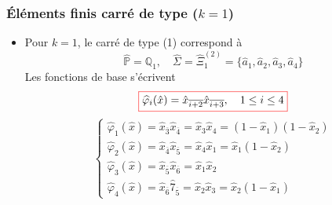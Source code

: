 \documentclass{beamer}
\newcommand{\myredbox}[1]{\fcolorbox{red}{white}{$\displaystyle#1$}}
\begin{document}
\begin{frame}
\frametitle{Éléments finis carré de type ($k=1$)}
 \begin{center}
   \end{center}
  \begin{itemize}
\item  Pour $k = 1$, le carré de type (1) correspond à
\[\widehat{\mathbb{P}} = \mathbb{Q}_1,\quad \widehat{\Sigma} =\widehat{\Xi}_1^{(2)}=\{\hat{a}_1,\hat{a}_2,\hat{a}_3,\hat{a}_4\}\]
Les fonctions de base s'écrivent
\[\myredbox{\widehat{\varphi}_i(\hat{x})=\hat{x}_{\overline{i+2}}\hat{x}_{\overline{i+3}},\quad 1\leq i\leq 4}\]
\[\left\{\begin{array}{l}
\widehat{\varphi}_1(\hat{x})=\hat{x}_{\overline{3}}\hat{x}_{\overline{4}}=\hat{x}_{3}\hat{x}_{4}=(1-\hat{x}_1)(1-\hat{x}_2)\\
\widehat{\varphi}_2(\hat{x})=\hat{x}_{\overline{4}}\hat{x}_{\overline{5}}=\hat{x}_{4}\hat{x}_{1}=\hat{x}_1(1-\hat{x}_2)\\
\widehat{\varphi}_3(\hat{x})=\hat{x}_{\overline{5}}\hat{x}_{\overline{6}}=\hat{x}_{1}\hat{x}_{2}\\
\widehat{\varphi}_4(\hat{x})=\hat{x}_{\overline{6}}\hat{7}_{\overline{5}}=\hat{x}_{2}\hat{x}_{3}=\hat{x}_2(1-\hat{x}_1)
\end{array}\right.
\]

\end{itemize}
\end{frame}
\end{document}
